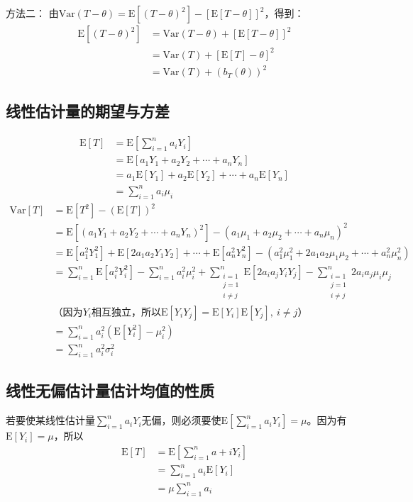 \documentclass[UTF8]{ctexbook}
\begin{document}
方法二：
由$\mathrm{Var}(T-\theta)=\mathrm{E}[(T-\theta)^2]-[\mathrm{E}[T-\theta]]^2$，得到：
\begin{align*}
	\mathrm{E}[(T-\theta)^2]&=\mathrm{Var}(T-\theta)+[\mathrm{E}[T-\theta]]^2\\
	&=\mathrm{Var}(T)+[\mathrm{E}[T]-\theta]^2\\
	&=\mathrm{Var}(T)+(b_T(\theta))^2
\end{align*}
\subsection{线性估计量的期望与方差}
\label{proof2}
\begin{align*}
	\mathrm{E}[T]&=\mathrm{E}[\sum_{i=1}^na_iY_i]\\
	&=\mathrm{E}[a_1Y_1+a_2Y_2+\cdots+a_nY_n]\\
	&=a_1\mathrm{E}[Y_1]+a_2\mathrm{E}[Y_2]+\cdots+a_n\mathrm{E}[Y_n]\\
	&=\sum_{i=1}^na_i\mu_i
\end{align*}
\begin{align*}
	\mathrm{Var}[T]&=\mathrm{E}[T^2]-(\mathrm{E}[T])^2\\
	&=\mathrm{E}[(a_1Y_1+a_2Y_2+\cdots+a_nY_n)^2]-(a_1\mu_1+a_2\mu_2+\cdots+a_n\mu_n)^2\\
	&=\mathrm{E}[a_1^2Y_1^2]+\mathrm{E}[2a_1a_2Y_1Y_2]+\cdots+\mathrm{E}[a_n^2Y_n^2]-(a_1^2\mu_1^2+2a_1a_2\mu_1\mu_2+\cdots+a_n^2\mu_n^2)\\
	&=\sum_{i=1}^n\mathrm{E}[a_i^2Y_i^2]-\sum_{i=1}^na_i^2\mu_i^2+\sum_{\substack{i=1\\j=1\\i\neq j}}^n\mathrm{E}[2a_ia_jY_iY_j]-\sum_{\substack{i=1\\j=1\\i\neq j}}^n2a_ia_j\mu_i\mu_j\\
	&\text{（因为$Y_i$相互独立，所以$\mathrm{E}[Y_iY_j]=\mathrm{E}[Y_i]\mathrm{E}[Y_j],\ i\neq j$）}\\
	&=\sum_{i=1}^na_i^2(\mathrm{E}[Y_i^2]-\mu_i^2)\\
	&=\sum_{i=1}^na_i^2\sigma_i^2
\end{align*}
\subsection{线性无偏估计量估计均值的性质}
\label{proof3}
若要使某线性估计量$\sum_{i=1}^na_iY_i$无偏，则必须要使$\mathrm{E}[\sum_{i=1}^na_iY_i]=\mu$。因为有$\mathrm{E}[Y_i]=\mu$，所以
\begin{align*}
	\mathrm{E}[T]&=\mathrm{E}[\sum_{i=1}^na+iY_i]\\
	&=\sum_{i=1}^na_i\mathrm{E}[Y_i]\\
	&=\mu\sum_{i=1}^na_i
\end{align*}
\end{document}
